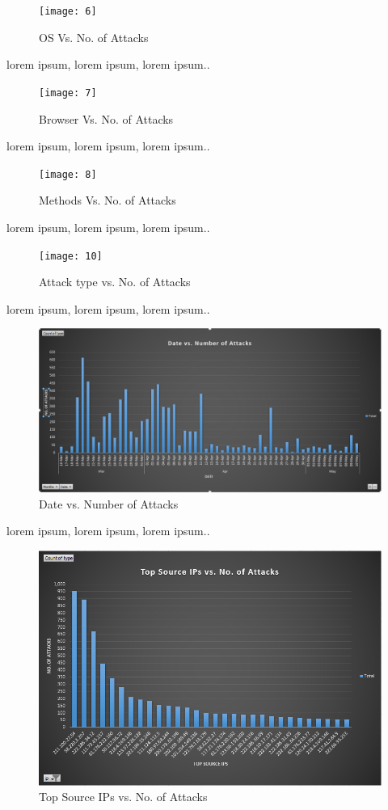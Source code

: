 \documentclass{article}
\begin{document}
\begin{figure}[h]
\caption{OS Vs. No. of Attacks}
\centering
\texttt{[image: 6]}
\end{figure}


lorem ipsum, lorem ipsum, lorem ipsum..

\begin{figure}[h]
\caption{Browser Vs. No. of Attacks}
\centering
\texttt{[image: 7]}
\end{figure}

lorem ipsum, lorem ipsum, lorem ipsum..

\begin{figure}[h]
\caption{Methods Vs. No. of Attacks}
\centering
\texttt{[image: 8]}
\end{figure}

lorem ipsum, lorem ipsum, lorem ipsum..

\begin{figure}[h]
\caption{Attack type vs. No. of Attacks}
\centering
\texttt{[image: 10]}
\end{figure}


lorem ipsum, lorem ipsum, lorem ipsum..

\begin{figure}[h]
\caption{Date vs. Number of Attacks}
\centering
\includegraphics[width=0.7\linewidth]{11}
\end{figure}
lorem ipsum, lorem ipsum, lorem ipsum..

\begin{figure}[h]
\caption{Top Source IPs vs. No. of Attacks}
\centering
\includegraphics[width=0.7\linewidth]{12}
\end{figure}
\end{document}
